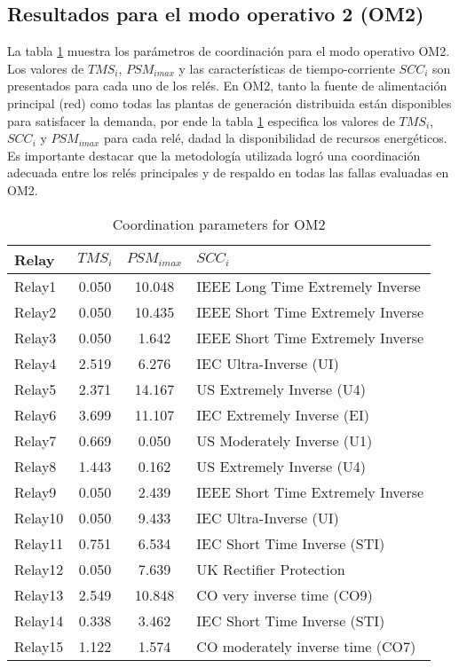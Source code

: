 \documentclass[journal,article,submit,pdftex,moreauthors]{Definitions/mdpi}
\begin{document}
\subsection{Resultados para el modo operativo 2 (OM2)}

La tabla \ref{tablaDialOM2} muestra los parámetros de coordinación para el modo operativo OM2. Los valores de $TMS_i$, $PSM_{imax}$ y las características de tiempo-corriente $SCC_i$ son presentados para cada uno de los relés. En OM2, tanto la fuente de alimentación principal (red) como todas las plantas de generación distribuida están disponibles para satisfacer la demanda, por ende la tabla \ref{tablaDialOM2} especifica los valores de $TMS_i$, $SCC_{i}$ y $PSM_{imax}$ para cada relé, dadad la disponibilidad de recursos energéticos. Es importante destacar que la metodología utilizada logró una coordinación adecuada entre los relés principales y de respaldo en todas las fallas evaluadas en OM2.


\begin{table}[H]
\caption{Coordination parameters for OM2}
\label{tablaDialOM2}
\centering
\begin{tabular}{lccl}
\toprule
\textbf{Relay }	& \textbf{ $TMS_i$} &     \textbf{ $PSM_{imax}$} & \textbf{$SCC_i$}\\
\midrule
Relay1 & 0.050 & 10.048 & IEEE Long Time Extremely Inverse \\
Relay2 & 0.050 & 10.435 & IEEE Short Time Extremely Inverse \\
Relay3 & 0.050 & 1.642 & IEEE Short Time Extremely Inverse \\
Relay4 & 2.519 & 6.276 & IEC Ultra-Inverse (UI) \\
Relay5 & 2.371 & 14.167 & US Extremely Inverse (U4) \\
Relay6 & 3.699 & 11.107 & IEC Extremely Inverse (EI) \\
Relay7 & 0.669 & 0.050 & US Moderately Inverse (U1) \\
Relay8 & 1.443 & 0.162 & US Extremely Inverse (U4) \\
Relay9 & 0.050 & 2.439 & IEEE Short Time Extremely Inverse \\
Relay10 & 0.050 & 9.433 & IEC Ultra-Inverse (UI) \\
Relay11 & 0.751 & 6.534 & IEC Short Time Inverse (STI) \\
Relay12 & 0.050 & 7.639 & UK Rectifier Protection \\
Relay13 & 2.549 & 10.848 & CO very inverse time (CO9) \\
Relay14 & 0.338 & 3.462 & IEC Short Time Inverse (STI) \\
Relay15 & 1.122 & 1.574 & CO moderately inverse time (CO7) \\
\bottomrule
\end{tabular}
\end{table}
\end{document}
